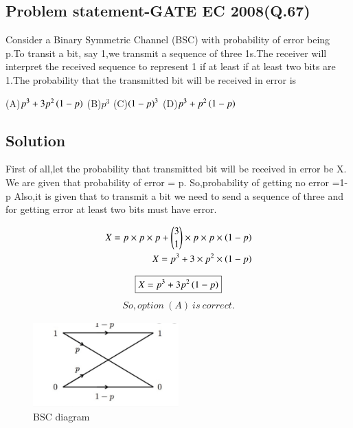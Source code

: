 \documentclass[journal,12pt,twocolumn]{IEEEtran}
\begin{document}
 \begin{center}
     \section{\textbf{Problem statement-GATE EC 2008(Q.67)}}
Consider a Binary Symmetric Channel (BSC) with probability of error being p.To transit a bit, say 1,we transmit a sequence of three 1s.The receiver will interpret the received sequence to represent 1 if at least if at least two bits are 1.The probability that the transmitted bit will be received in error is
 \end{center}
(A)$p^3 + 3 p^2\left(1-p\right)$ 
\newline
(B)$p^3$
\newline
(C)$\left(1-p\right)^3$
\newline
(D)$p^3+p^2\left(1-p\right)$
\begin{center}
    \section{\textbf{Solution}}
\end{center}

First of all,let the probability that transmitted bit will be received in error be X.
\newline
We are given that probability of error = p.  
\newline
So,probability of getting no error =1-p
\newline
Also,it is given that to transmit a bit we need to send a sequence of three and for getting error at least two bits must have error.

\begin{align}
    X =p \times p \times p + {3 \choose 1} \times p \times p \times \left(1-p\right)
    \\
    X = p^3+3 \times p^2 \times \left(1-p\right)
\end{align}

\begin{equation}
    \boxed{X=p^3+3p^2 \left(1-p\right)}
\end{equation}
\begin{align}
   So,option \ (A) \ is \ correct.
\end{align}
\begin{figure}[ht]
    \centering
    \includegraphics[width=0.5\textwidth]{BSC diagram.jpg}
    \caption{BSC diagram}
\end{figure}
\end{document}
